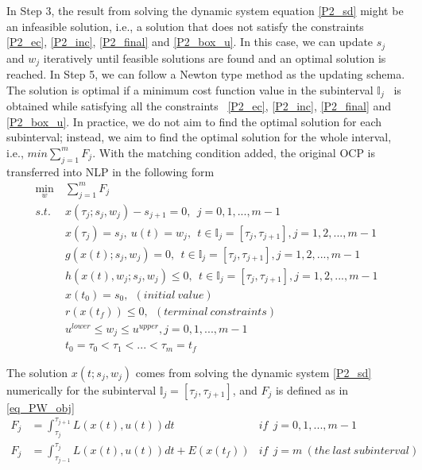 \documentclass  [
  paper    = a4,
  BCOR     = 10mm,
  twoside,
  fontsize = 12pt,
  fleqn,
  toc      = bibnumbered,
  toc      = listofnumbered,
  numbers  = noendperiod,
  headings = normal,
  listof   = leveldown,
  version  = 3.03
]                                       {scrreprt}
\newcommand{\<}{\langle}
\renewcommand{\>}{\rangle}
\begin{document}
In Step 3, the result from solving the dynamic system equation \ref{P2_sd} might be an infeasible solution, i.e., a solution that does not satisfy the constraints \ref{P2_ec}, \ref{P2_inc}, \ref{P2_final} and \ref{P2_box_u}. In this case, we can update $s_j$ and $w_j$ iteratively until feasible solutions are found and an optimal solution is reached. In Step 5, we can follow a Newton type method as the updating schema. The solution is optimal if a minimum cost function value in the subinterval $\mathbb{I}_j$  is obtained while satisfying all the constraints  \ref{P2_ec}, \ref{P2_inc}, \ref{P2_final} and \ref{P2_box_u}. In practice, we do not aim to find the optimal solution for each subinterval; instead, we aim to find the optimal solution for the whole interval, i.e., $min  \sum_{j=1}^{m} F_j $. With the matching condition added, the original OCP is transferred into NLP in the following form
	\begin{subequations}
	\begin{align}
		\underset{w}{\text{min}}   \ &  \sum_{j=1}^{m} F_j   \label{P3_obj}   \\
		s.t. \ \ & x(\tau_j; s_j, w_j) - s_{j+1} = 0,   \ \  j = 0, 1, ...,m -1 \label{P3_eq}  \\
		& x(\tau_j) = s_j, \  u(t) = w_j, \ \  t \in \mathbb{I}_j =[\tau_j, \tau_{j+1}], j = 1, 2, ... , m-1 \\
		 &  g(x(t); s_j, w_j)  = 0,     \ \  t \in \mathbb{I}_j =[\tau_j, \tau_{j+1}], j = 1, 2, ... , m-1 \\
		 & h(x(t),w_j; s_j, w_j) \leq 0,    \ \  t \in \mathbb{I}_j =[\tau_j, \tau_{j+1}], j = 1, 2, ... , m-1   \\
    	& x(t_0) = s_0, \ \ (initial \ value) \\
	& r(x(t_f)) \leq 0, \ \ (terminal \ constraints) \\
	& u^{lower} \leq w_j \leq u^{upper} ,   j = 0, 1, ... , m-1 \\ 
		         &   t_0 = \tau_0 < \tau_1 < ... < \tau_m = t_f 
	\end{align}
	\label{P3_MSNLP}
\end{subequations}  

The  solution  $x(t; s_j, w_j)$ comes from solving the dynamic system \ref{P2_sd} numerically for the subinterval  $\mathbb{I}_j =[\tau_j, \tau_{j+1}]$,  and $F_j$ is defined as in \ref{eq_PW_obj}
\begin{equation}\label{eq_PW_obj}
	\begin{aligned}
		F_j &= \int_{\tau_{j}}^{\tau_{j+1}}L(x(t), u(t))dt   &if \ \   j= 0, 1, ..., m-1 \\ 
		F_j  & = \int_{\tau_{j-1}}^{\tau_j}L(x(t), u(t))dt + E (x(t_f)) &if\ \   j =m  \ (the\  last\  subinterval)
	\end{aligned}
\end{equation}
\end{document}
